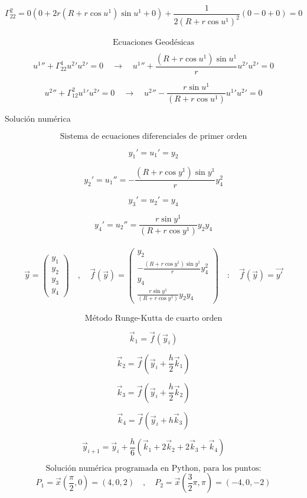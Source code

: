 \documentclass[10pt,a4papper]{article}
\begin{document}
\[\Gamma_{22}^2=0(0+2r(R+r\cos u^1)\sin u^1+0)+\frac{1}{2(R+r\cos u^1)^2}(0-0+0)=0\]\\

\newpage
\[\text{Ecuaciones Geodésicas}\]

\[u^1''+\Gamma_{22}^1u^2'u^2'=0\quad\to\quad
u^1''+\frac{(R+r\cos u^1)\sin u^1}{r}u^2'u^2'=0\]

\[u^2''+\Gamma_{12}^2u^1'u^2'=0\quad\to\quad
u^2''-\frac{r\sin u^1}{(R+r\cos u^1)}u^1'u^2'=0\]

\newpage
Solución numérica

\[\text{Sistema de ecuaciones diferenciales de primer orden}\]

\[y_1'=u_1'=y_2\]

\[y_2'=u_1''=-\frac{(R+r\cos y^1)\sin y^1}{r}y_4^2\]

\[y_3'=u_2'=y_4\]

\[y_4'=u_2''=\frac{r\sin y^1}{(R+r\cos y^1)}y_2y_4\]\\

\[\vec y=
\begin{pmatrix}
  y_1\\
  y_2\\
  y_3\\
  y_4
\end{pmatrix}\quad,\quad
\vec f(\vec y)=
\begin{pmatrix}
  y_2\\
  -\frac{(R+r\cos y^1)\sin y^1}{r}y_4^2\\
  y_4\\
  \frac{r\sin y^1}{(R+r\cos y^1)}y_2y_4
\end{pmatrix}\quad:\quad
\vec f(\vec y)=\vec{y'}\]\\

\[\text{Método Runge-Kutta de cuarto orden}\]

\[\vec k_1=\vec f(\vec y_i)\]

\[\vec k_2=\vec f\left(\vec y_i+\frac{h}{2}\vec k_1\right)\]

\[\vec k_3=\vec f\left(\vec y_i+\frac{h}{2}\vec k_2\right)\]

\[\vec k_4=\vec f\left(\vec y_i+h\vec k_3\right)\]

\[\vec y_{i+1}=\vec y_i+\frac{h}{6}\left(\vec k_1+2\vec k_2+2\vec k_3+\vec k_4\right)\]

\newpage
\[\text{Solución numérica programada en Python, para los puntos:}\]
\[P_1=\vec x\left(\frac{\pi}{2},0\right)=(4,0,2)\quad,\quad
P_2=\vec x\left(\frac{3}{2}\pi,\pi\right)=(-4,0,-2)\]
\end{document}
